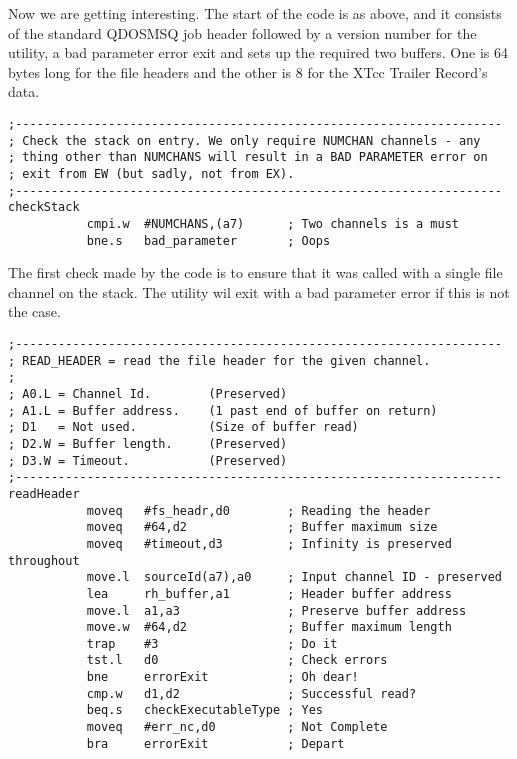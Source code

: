 Now we are getting interesting. The start of the code is as above, and it consists of the standard QDOSMSQ job header followed by a version number for the utility, a bad parameter error exit and sets up the required two buffers. One is 64 bytes long for the file headers and the other is 8 for the XTcc Trailer Record's data.

\begin{lstlisting}[firstnumber=last,caption={XTcc - Channel Checking}]
;--------------------------------------------------------------------
; Check the stack on entry. We only require NUMCHAN channels - any
; thing other than NUMCHANS will result in a BAD PARAMETER error on
; exit from EW (but sadly, not from EX).
;--------------------------------------------------------------------
checkStack
           cmpi.w  #NUMCHANS,(a7)      ; Two channels is a must
           bne.s   bad_parameter       ; Oops
\end{lstlisting}

The first check made by the code is to ensure that it was called with a single file channel on the stack. The utility wil exit with a bad parameter error if this is not the case.


\begin{lstlisting}[firstnumber=last,caption={XTcc - Read the File Header}]
;--------------------------------------------------------------------
; READ_HEADER = read the file header for the given channel.
;
; A0.L = Channel Id.        (Preserved)
; A1.L = Buffer address.    (1 past end of buffer on return)
; D1   = Not used.          (Size of buffer read)
; D2.W = Buffer length.     (Preserved)
; D3.W = Timeout.           (Preserved)
;--------------------------------------------------------------------
readHeader
           moveq   #fs_headr,d0        ; Reading the header
           moveq   #64,d2              ; Buffer maximum size
           moveq   #timeout,d3         ; Infinity is preserved throughout
           move.l  sourceId(a7),a0     ; Input channel ID - preserved
           lea     rh_buffer,a1        ; Header buffer address
           move.l  a1,a3               ; Preserve buffer address
           move.w  #64,d2              ; Buffer maximum length
           trap    #3                  ; Do it
           tst.l   d0                  ; Check errors
           bne     errorExit           ; Oh dear!
           cmp.w   d1,d2               ; Successful read?
           beq.s   checkExecutableType ; Yes
           moveq   #err_nc,d0          ; Not Complete
           bra     errorExit           ; Depart
\end{lstlisting}

